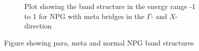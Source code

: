 \begin{figure}
\begin{subfigure}[b]{0.3\textwidth}
        \caption{Plot showing the band structure in the energy range -1 to 1 for NPG with meta bridges in the \(\Gamma\)- and \(X\)-direction}
        \label{metabs}
    \end{subfigure}
    \caption{Figure showing para, meta and normal NPG band structures}\label{allbands}
\end{figure}
